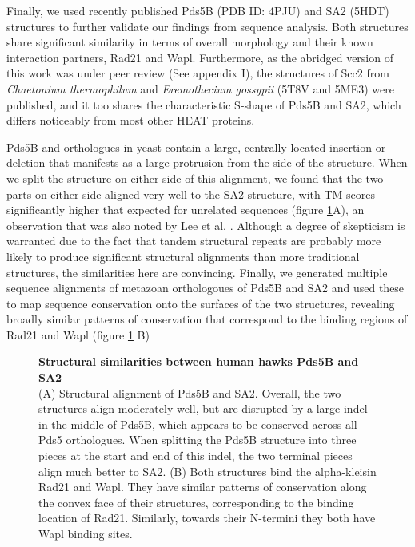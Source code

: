 \documentclass[a4paper,11pt,twoside,openright]{scrbook}
\begin{document}
Finally, we used recently published Pds5B \cite{Ouyang2016} (PDB ID: 4PJU) and SA2 \cite{Hara2014} (5HDT) structures to further validate our findings from sequence analysis. Both structures share significant similarity in terms of overall morphology and their known interaction partners, Rad21 and Wapl. Furthermore, as the abridged version of this work was under peer review \cite{Wells2017} (See appendix I), the structures of Scc2 from \textit{Chaetonium thermophilum} \cite{Kikuchi2016} and \textit{Eremothecium gossypii} \cite{Chao2017} (5T8V and 5ME3) were published, and it too shares the characteristic S-shape of Pds5B and SA2, which differs noticeably from most other HEAT proteins.

Pds5B and orthologues in yeast contain a large, centrally located insertion or deletion that manifests as a large protrusion from the side of the structure. When we split the structure on either side of this alignment, we found that the two parts on either side aligned very well to the SA2 structure, with TM-scores significantly higher that expected for unrelated sequences (figure \ref{c2f3}A), an observation that was also noted by Lee et al. \cite{Lee2016}. Although a degree of skepticism is warranted due to the fact that tandem structural repeats are probably more likely to produce significant structural alignments than more traditional structures, the similarities here are convincing. Finally, we generated multiple sequence alignments of metazoan orthologoues of Pds5B and SA2 and used these to map sequence conservation onto the surfaces of the two structures, revealing broadly similar patterns of conservation that correspond to the binding regions of Rad21 and Wapl (figure \ref{c2f3} B)

\begin{figure}[h]
    \caption[Structural similarities between human hawks Pds5B and SA2]{\sffamily \textbf{Structural similarities between human hawks Pds5B and SA2} \\ \small (A) Structural alignment of Pds5B and SA2. Overall, the two structures align moderately well, but are disrupted by a large indel in the middle of Pds5B, which appears to be conserved across all Pds5 orthologues. When splitting the Pds5B structure into three pieces at the start and end of this indel, the two terminal pieces align much better to SA2. (B) Both structures bind the alpha-kleisin Rad21 and Wapl. They have similar patterns of conservation along the convex face of their structures, corresponding to the binding location of Rad21. Similarly, towards their N-termini they both have Wapl binding sites.}
    \label{c2f3}
\end{figure}
\end{document}
